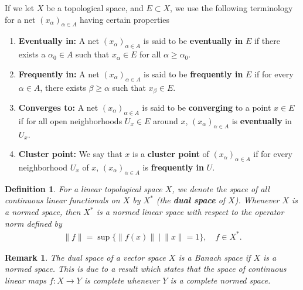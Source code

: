 \documentclass[10pt,twoside,openany,final]{memoir}
\theoremstyle{break}
\newtheorem{definition}[section]{Definition}
\theoremstyle{Break}
\newtheorem{remark}[section]{Remark}
\newcommand{\lv}{\lVert}
\newcommand{\rv}{\rVert}
\begin{document}
If we let $X$ be a topological space, and $E \subset X$, we use the following terminology for a net $(x_{\alpha})_{\alpha \in A}$ having certain properties
\begin{enumerate}
\item \textbf{Eventually in:} A net $(x_{\alpha})_{\alpha \in A}$ is said to be \textbf{eventually in} $E$ if there exists a $\alpha_{0} \in A$ such that $x_{\alpha} \in E$ for all $\alpha \geq \alpha_{0}$.
\item \textbf{Frequently in:}  A net $(x_{\alpha})_{\alpha \in A}$ is said to be \textbf{frequently in} $E$ if for every $\alpha \in A$, there exists $\beta \geq \alpha$ such that $x_{\beta} \in E$.
\item \textbf{Converges to:}  A net $(x_{\alpha})_{\alpha \in A}$ is said to be \textbf{converging} to a point $x \in E$ if for all open neighborhoods $U_{x} \in E$ around $x$, $(x_{\alpha})_{\alpha \in A}$ is \textbf{eventually} in $U_{x}$. 
\item \textbf{Cluster point:} We say that $x$ is a \textbf{cluster point} of $(x_{\alpha})_{\alpha \in A}$ if for every neighborhood $U_{x}$ of $x$, $(x_{\alpha})_{\alpha \in A}$ is \textbf{frequently in} $U$.
\end{enumerate}
\begin{definition}
For a linear topological space $X$, we denote the space of all continuous linear functionals on $X$ by $X^*$ (the \textbf{dual space} of $X$). Whenever $X$ is a normed space, then $X^*$ is a normed linear space with respect to the operator norm defined by
\begin{align*}
\lv f \rv = \sup\{ \lv f(x) \rv \ \big| \ \lv x \rv = 1 \}, \quad f \in X^*.
\end{align*}
\end{definition}
\begin{remark}
The dual space of a vector space $X$ is a Banach space if $X$ is a normed space. This is due to a result which states that the space of continuous linear maps $f\colon X \to Y$ is complete whenever $Y$ is a complete normed space.
\end{remark}
\end{document}
